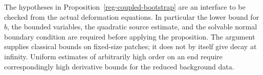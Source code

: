 \begin{remark}
The hypotheses in Proposition~\ref{reg-coupled-bootstrap} are
an interface to be checked from the actual deformation equations.
In particular the lower bound for $b$, the bounded variables,
the quadratic source estimate, and the solvable normal boundary
condition are required before applying the proposition. The
argument supplies classical bounds on fixed-size patches; it
does not by itself give decay at infinity. Uniform estimates of
arbitrarily high order on an end require correspondingly high
derivative bounds for the reduced background data.
\end{remark}
